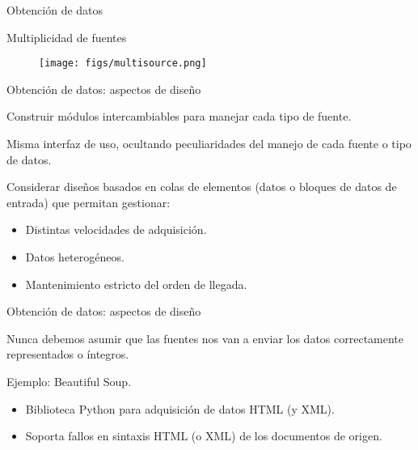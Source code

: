 \begin{frame}{Obtención de datos}
 \begin{wideitemize}
  \item Multiplicidad de fuentes
\end{wideitemize}
  \begin{figure}
   \centering
   \texttt{[image: figs/multisource.png]}
  \end{figure}

\end{frame}
\begin{frame}{Obtención de datos: aspectos de diseño}
 \begin{wideitemize}
  \item Construir módulos intercambiables para manejar cada tipo de fuente.
  \item Misma interfaz de uso, ocultando peculiaridades del manejo de cada
  fuente o tipo de datos.
  \item Considerar diseños basados en colas de elementos (datos o bloques de
  datos de entrada) que permitan gestionar:
  \begin{itemize}
   \item Distintas velocidades de adquisición.
   \item Datos heterogéneos.
   \item Mantenimiento estricto del orden de llegada.
  \end{itemize}

 \end{wideitemize}

\end{frame}


\begin{frame}{Obtención de datos: aspectos de diseño}
 \begin{wideitemize}
  \item Nunca debemos asumir que las fuentes nos van a enviar los datos
  correctamente representados o íntegros.
  \item Ejemplo: Beautiful Soup.
  \begin{itemize}
   \item Biblioteca Python para adquisición de datos HTML (y XML).
   \item Soporta fallos en sintaxis HTML (o XML) de los documentos de origen.
  \end{itemize}

 \end{wideitemize}

\end{frame}

